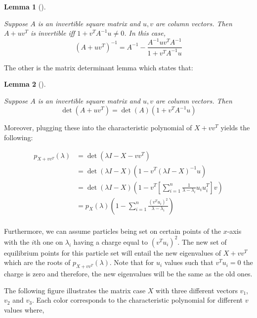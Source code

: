 \documentclass[
  letterpaper,
  DIV=11,
  numbers=noendperiod]{scrartcl}
\theoremstyle{plain}
\theoremstyle{plain}
\theoremstyle{plain}
\newtheorem{lemma}{Lemma}[section]
\theoremstyle{definition}
\theoremstyle{plain}
\theoremstyle{remark}
\begin{document}
\leavevmode{}%
\begin{lemma}[]\label{lem-sherman-morrison}

Suppose \(A\) is an invertible square matrix and \(u, v\) are column
vectors. Then \(A + uv^T\) is invertible iff
\(1 + v^T A^{-1} u \neq 0\). In this case,
\[(A + uv^T)^{-1} = A^{-1} - \frac{A^{-1}uv^TA^{-1}}{1 + v^TA^{-1}u}\]

\end{lemma}

The other is the matrix determinant lemma which states that:

\leavevmode{}%
\begin{lemma}[]\label{lem-matrix-determinant}

Suppose \(A\) is an invertible square matrix and \(u, v\) are column
vectors. Then \[\det(A + uv^T) = \det(A) (1 + v^T A^{-1} u)\]

\end{lemma}

Moreover, plugging these into the characteristic polynomial of
\(X + vv^T\) yields the following:

\begin{align*}
p_{X + vv^T}(\lambda) &= \det(\lambda I - X - vv^T) \\
& = \det(\lambda I - X) (1 - v^T \left(\lambda I - X \right)^{-1}u) \\
& = \det (\lambda I - X) \left(1 - v^T \left[\sum_{i=1}^n \frac{1}{\lambda - \lambda_i} u_i u_i^T\right] v\right)\\
& = p_X(\lambda) \left(1 -  \sum_{i=1}^n \frac{(v^Tu_i)^2}{\lambda - \lambda_i}\right)\\
\end{align*}

Furthermore, we can assume particles being set on certain points of the
\(x\)-axis with the \(i\)th one on \(\lambda_i\) having a charge equal
to \((v^Tu_i)^2\). The new set of equilibrium points for this particle
set will entail the new eigenvalues of \(X + vv^T\) which are the roots
of \(p_{X + vv^T}(\lambda)\). Note that for \(u_i\) values such that
\(v^Tu_i=0\) the charge is zero and therefore, the new eigenvalues will
be the same as the old ones.

The following figure illustrates the matrix case \(X\) with three
different vectors \(v_1\), \(v_2\) and \(v_3\). Each color corresponds
to the characteristic polynomial for different \(v\) values where,
\end{document}
